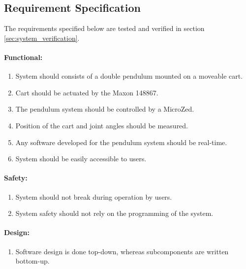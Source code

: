 \subsection{Requirement Specification}
\label{sub:requirements}
The requirements specified below are tested and verified in section \ref{sec:system_verification}.

\paragraph{Functional:}
\begin{enumerate}	
	\item System should consists of a double pendulum mounted on a moveable cart.
	\label{enum:system_consists_double_pendulum}
	\item Cart should be actuated by the Maxon 148867. 
	\label{enum:cart_actuated_by_motor}
	\item The pendulum system should be controlled by a MicroZed.
	\label{enum:controlled_by_microzed}
	\item Position of the cart and joint angles should be measured.
	\label{enum:position_cart_joint_angle_measure}
	\item Any software developed for the pendulum system should be real-time.
	\label{enum:software_developed_real_time}
	\item System should be easily accessible to users.
	\label{enum:system_accessible_to_users}
\end{enumerate}

\paragraph{Safety:}
\begin{enumerate}[resume]
	\item System should not break during operation by users.
	\label{enum:system_should_not_break_during_operation}
	\item System safety should not rely on the programming of the system.
	\label{enum:safety_should_not_rely_on_programming}
\end{enumerate}

\paragraph{Design:}
\begin{enumerate}[resume]
	 \item Software design is done top-down, whereas subcomponents are written bottom-up. 
	 \label{enum:software_top_down_bottom_up}
\end{enumerate}